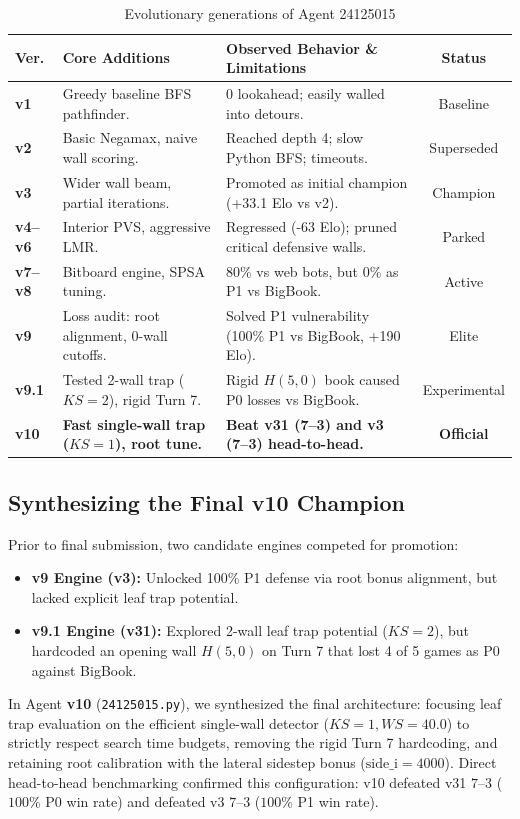 \begin{table}[htbp]
\centering
\small
\renewcommand{\arraystretch}{1.2}
\begin{tabularx}{\textwidth}{lp{4.2cm}p{6.8cm}c}
\toprule
\textbf{Ver.} & \textbf{Core Additions} & \textbf{Observed Behavior \& Limitations} & \textbf{Status} \\
\midrule
\textbf{v1} & Greedy baseline BFS pathfinder. & 0 lookahead; easily walled into detours. & Baseline \\
\textbf{v2} & Basic Negamax, naive wall scoring. & Reached depth 4; slow Python BFS; timeouts. & Superseded \\
\textbf{v3} & Wider wall beam, partial iterations. & Promoted as initial champion (+33.1 Elo vs v2). & Champion \\
\textbf{v4--v6} & Interior PVS, aggressive LMR. & Regressed (-63 Elo); pruned critical defensive walls. & Parked \\
\textbf{v7--v8} & Bitboard engine, SPSA tuning. & 80\% vs web bots, but 0\% as P1 vs BigBook. & Active \\
\textbf{v9} & Loss audit: root alignment, 0-wall cutoffs. & Solved P1 vulnerability (100\% P1 vs BigBook, +190 Elo). & Elite \\
\textbf{v9.1} & Tested 2-wall trap ($KS=2$), rigid Turn 7. & Rigid $H(5,0)$ book caused P0 losses vs BigBook. & Experimental \\
\textbf{v10} & \textbf{Fast single-wall trap ($KS=1$), root tune.} & \textbf{Beat v31 (7--3) and v3 (7--3) head-to-head.} & \textbf{Official} \\
\bottomrule
\end{tabularx}
\caption{Evolutionary generations of Agent 24125015}
\label{tab:versions}
\end{table}

\subsection{Synthesizing the Final v10 Champion}
Prior to final submission, two candidate engines competed for promotion:
\begin{itemize}[leftmargin=1.5em]
    \item \textbf{v9 Engine (v3):} Unlocked 100\% P1 defense via root bonus alignment, but lacked explicit leaf trap potential.
    \item \textbf{v9.1 Engine (v31):} Explored 2-wall leaf trap potential ($KS = 2$), but hardcoded an opening wall $H(5,0)$ on Turn 7 that lost 4 of 5 games as P0 against BigBook.
\end{itemize}

In Agent \textbf{v10} (\texttt{24125015.py}), we synthesized the final architecture: focusing leaf trap evaluation on the efficient single-wall detector ($KS = 1, WS = 40.0$) to strictly respect search time budgets, removing the rigid Turn 7 hardcoding, and retaining root calibration with the lateral sidestep bonus ($\text{side\_i} = 4000$). Direct head-to-head benchmarking confirmed this configuration: v10 defeated v31 $7\text{--}3$ ($100\%$ P0 win rate) and defeated v3 $7\text{--}3$ ($100\%$ P1 win rate).
